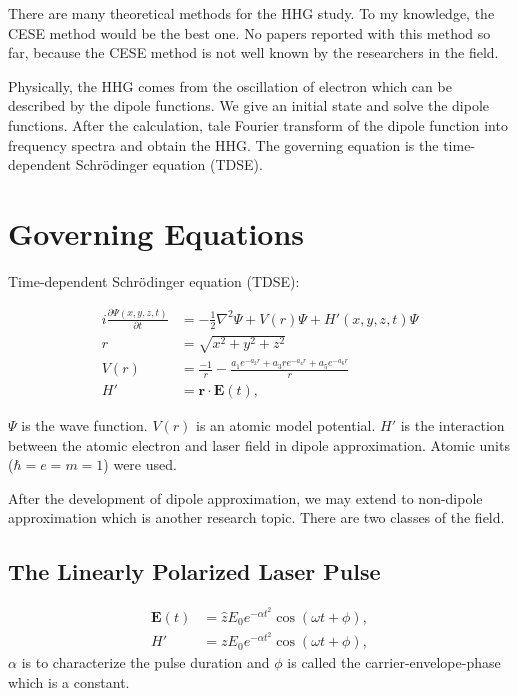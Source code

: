 \documentclass{isildur}
\begin{document}
There are many theoretical methods for the HHG study.  To my knowledge, the
CESE method would be the best one.  No papers reported with this method so far,
because the CESE method is not well known by the researchers in the field.

Physically, the HHG comes from the oscillation of electron which can be
described by the dipole functions. We give an initial state and solve the
dipole functions.  After the calculation, tale Fourier transform of the dipole
function into frequency spectra and obtain the HHG.  The governing equation is
the time-dependent Schrödinger equation (TDSE).

\chapter{Governing Equations}
\label{c:goveq}

Time-dependent Schrödinger equation (TDSE):

\begin{align}
  i\frac{\partial \Psi(x, y, z, t)}{\partial t}
    &= -\frac{1}{2}\nabla^2\Psi + V(r)\Psi + H'(x, y, z, t)\Psi
    \label{e:tdse} \\
  r &= \sqrt{x^2+y^2+z^2} \nonumber \\
  V(r) &= \frac{-1}{r}
        - \frac{a_1e^{-a_2r}+a_3re^{-a_4r}+a_5e^{-a_6r}}{r} \\
  H' &= \mathbf{r}\cdot \mathbf{E}(t),
\end{align}

$\Psi$ is the wave function.  $V(r)$ is an atomic model potential.  $H'$ is the
interaction between the atomic electron and laser field in dipole
approximation.  Atomic units ($\hbar = e = m = 1$) were used.

After the development of dipole approximation, we may extend to non-dipole
approximation which is another research topic.  There are two classes of the
field.

\section{The Linearly Polarized Laser Pulse}

\begin{align}
  \mathbf{E}(t) &= {\hat z}E_0e^{-\alpha t^2}\cos(\omega t+\phi), \\
  H' &= zE_0e^{-\alpha t^2}\cos(\omega t+\phi),
\end{align}
%
$\alpha$ is to characterize the pulse duration and $\phi$ is called the
carrier-envelope-phase which is a constant.
\end{document}
